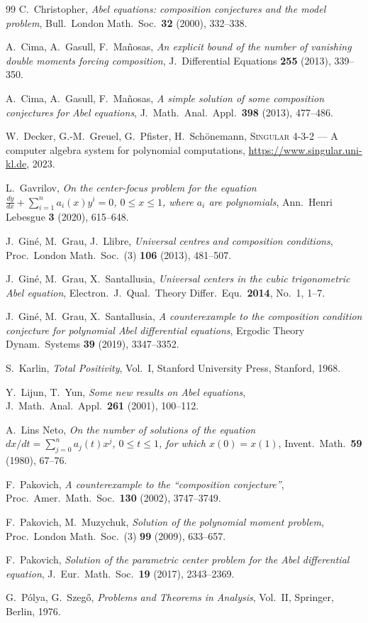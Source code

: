 \documentclass[11pt]{amsart}
\numberwithin{equation}{section}
\theoremstyle{plain}
\theoremstyle{definition}
\theoremstyle{remark}
\begin{document}
\begin{thebibliography}{99}
C.~Christopher,
\emph{Abel equations: composition conjectures and the model problem},
Bull.\ London Math.\ Soc.\ \textbf{32} (2000), 332--338.

A.~Cima, A.~Gasull, F.~Ma\~nosas,
\emph{An explicit bound of the number of vanishing double moments forcing composition},
J.\ Differential Equations \textbf{255} (2013), 339--350.

A.~Cima, A.~Gasull, F.~Ma\~nosas,
\emph{A simple solution of some composition conjectures for Abel equations},
J.\ Math.\ Anal.\ Appl.\ \textbf{398} (2013), 477--486.

W.~Decker, G.-M.~Greuel, G.~Pfister, H.~Sch\"onemann,
\textsc{Singular} 4-3-2 --- A computer algebra system for polynomial computations,
\url{https://www.singular.uni-kl.de}, 2023.

L.~Gavrilov,
\emph{On the center-focus problem for the equation
$\frac{dy}{dx}+\sum_{i=1}^n a_i(x)y^i=0$, $0\le x\le1$, where $a_i$ are polynomials},
Ann.\ Henri Lebesgue \textbf{3} (2020), 615--648.

J.~Gin\'e, M.~Grau, J.~Llibre,
\emph{Universal centres and composition conditions},
Proc.\ London Math.\ Soc.\ (3) \textbf{106} (2013), 481--507.

J.~Gin\'e, M.~Grau, X.~Santallusia,
\emph{Universal centers in the cubic trigonometric Abel equation},
Electron.\ J.\ Qual.\ Theory Differ.\ Equ.\ \textbf{2014}, No.~1, 1--7.

J.~Gin\'e, M.~Grau, X.~Santallusia,
\emph{A counterexample to the composition condition conjecture for polynomial Abel
differential equations},
Ergodic Theory Dynam.\ Systems \textbf{39} (2019), 3347--3352.

S.~Karlin,
\emph{Total Positivity}, Vol.~I, Stanford University Press, Stanford, 1968.

Y.~Lijun, T.~Yun,
\emph{Some new results on Abel equations},
J.\ Math.\ Anal.\ Appl.\ \textbf{261} (2001), 100--112.

A.~Lins Neto,
\emph{On the number of solutions of the equation
$dx/dt=\sum_{j=0}^na_j(t)x^j$, $0\le t\le1$, for which $x(0)=x(1)$},
Invent.\ Math.\ \textbf{59} (1980), 67--76.

F.~Pakovich,
\emph{A counterexample to the ``composition conjecture''},
Proc.\ Amer.\ Math.\ Soc.\ \textbf{130} (2002), 3747--3749.

F.~Pakovich, M.~Muzychuk,
\emph{Solution of the polynomial moment problem},
Proc.\ London Math.\ Soc.\ (3) \textbf{99} (2009), 633--657.

F.~Pakovich,
\emph{Solution of the parametric center problem for the Abel differential equation},
J.\ Eur.\ Math.\ Soc.\ \textbf{19} (2017), 2343--2369.

G.~P\'olya, G.~Szeg\H{o},
\emph{Problems and Theorems in Analysis}, Vol.~II, Springer, Berlin, 1976.

\end{thebibliography}
\end{document}
